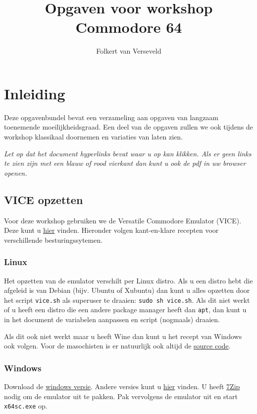 \documentclass{article}
\title{Opgaven voor workshop Commodore 64}
\author{Folkert van Verseveld}
\begin{document}
\maketitle

\section{Inleiding}

Deze opgavenbundel bevat een verzameling aan opgaven van langzaam toenemende moeilijkheidsgraad.
Een deel van de opgaven zullen we ook tijdens de workshop klassikaal doornemen en variaties van laten zien.

\emph{Let op dat het document hyperlinks bevat waar u op kan klikken.
Als er geen links te zien zijn met een blauw of rood vierkant dan kunt u ook de pdf in uw browser openen.}

\subsection{VICE opzetten}
Voor deze workshop gebruiken we de Versatile Commodore Emulator (VICE).
Deze kunt u \href{http://vice-emu.sourceforge.net/}{hier} vinden.
Hieronder volgen kant-en-klare recepten voor verschillende besturingssytemen.

\subsubsection{Linux}
Het opzetten van de emulator verschilt per Linux distro.
Als u een distro hebt die afgeleid is van Debian (bijv. Ubuntu of Xubuntu) dan kunt u alles opzetten door het script \verb:vice.sh: als superuser te draaien:
\verb:sudo sh vice.sh:.
Als dit niet werkt of u heeft een distro die een andere package manager heeft dan \verb:apt:, dan kunt u in het document de variabelen aanpassen en script (nogmaals) draaien.

Als dit ook niet werkt maar u heeft Wine dan kunt u het recept van Windows ook volgen.
Voor de masochisten is er natuurlijk ook altijd de \href{http://sourceforge.net/projects/vice-emu/files/releases/vice-3.1.tar.gz/download}{source code}.

\subsubsection{Windows}
Download de \href{http://sourceforge.net/projects/vice-emu/files/releases/binaries/windows/WinVICE-3.1-x64.7z/download}{windows versie}.
Andere versies kunt u \href{http://vice-emu.sourceforge.net/windows.html}{hier} vinden.
U heeft \href{http://www.7-zip.org/}{7Zip} nodig om de emulator uit te pakken.
Pak vervolgens de emulator uit en start \verb:x64sc.exe: op.
\end{document}
